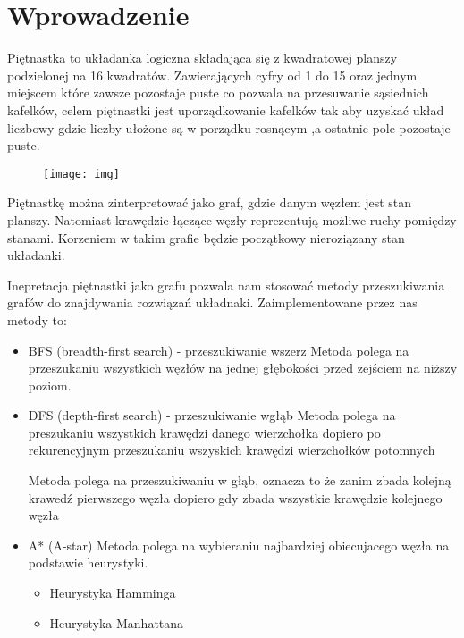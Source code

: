 \documentclass{classrep.cls}
\begin{document}
    \section{Wprowadzenie}
    {\color{red}

    Piętnastka to układanka logiczna składająca się z kwadratowej
    planszy podzielonej na 16 kwadratów. Zawierających cyfry od 1 do 15 oraz jednym miejscem które zawsze pozostaje puste
    co pozwala na przesuwanie sąsiednich kafelków, celem piętnastki jest uporządkowanie kafelków tak aby uzyskać układ liczbowy
    gdzie liczby ułożone są w porządku rosnącym ,a ostatnie pole pozostaje puste.

    \begin{figure}
        \centering
        \texttt{[image: img]}
        \caption{}
        \label{fig:Rozwiązana piętnastka}
    \end{figure}

    Piętnastkę można zinterpretować jako graf, gdzie danym węzłem jest stan planszy. Natomiast krawędzie łączące węzły
    reprezentują możliwe ruchy pomiędzy stanami. Korzeniem w takim grafie będzie początkowy nieroziązany stan układanki.

    Inepretacja piętnastki jako grafu pozwala nam stosować metody przeszukiwania grafów do znajdywania rozwiązań układnaki.
    Zaimplementowane przez nas metody to:
        \begin{itemize}
            \item BFS (breadth-first search) - przeszukiwanie wszerz
                Metoda polega na przeszukaniu wszystkich węzłów na jednej głębokości przed zejściem na niższy poziom.
            \item DFS (depth-first search) - przeszukiwanie wgłąb
                Metoda polega na preszukaniu wszystkich krawędzi danego wierzchołka dopiero po rekurencyjnym przeszukaniu
                wszyskich krawędzi wierzchołków potomnych

            Metoda polega na przeszukiwaniu w głąb, oznacza to że zanim zbada kolejną krawedź pierwszego węzła
            dopiero gdy zbada wszystkie krawędzie kolejnego węzła
            \item A* (A-star)
                Metoda polega na wybieraniu najbardziej obiecujacego węzła na podstawie heurystyki.
                \begin{itemize}
                    \item Heurystyka Hamminga
                    \item Heurystyka Manhattana
                \end{itemize}
        \end{itemize}

    }
\end{document}
